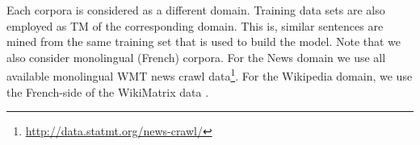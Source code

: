 \begin{table}[!ht]
\begin{center}
\end{center}
\caption{\label{tab:corpora} Corpora statistics. Note that K stands for thousands and $L_{mean}$ is the average length in words.}
\end{table}

Each corpora is considered as a different domain. Training data sets are also employed as TM of the corresponding domain.
This is, similar sentences are mined from the same training set that is used to build the model.
%
Note that we also consider monolingual (French) corpora. 
For the News domain we use all available monolingual WMT news crawl data\footnote{\url{http://data.statmt.org/news-crawl/}}.
For the Wikipedia domain, we use the French-side of the WikiMatrix data \cite{Schwenk19wikimatrix}.

